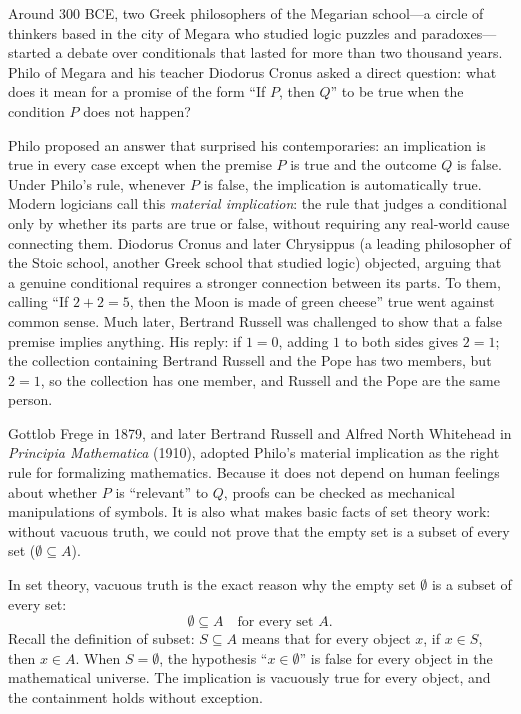 \begin{historybox}
Around 300 BCE, two Greek philosophers of the Megarian school---a circle of thinkers based in the city of Megara who studied logic puzzles and paradoxes---started a debate over conditionals that lasted for more than two thousand years. Philo of Megara and his teacher Diodorus Cronus asked a direct question: what does it mean for a promise of the form ``If $P$, then $Q$'' to be true when the condition $P$ does not happen?

Philo proposed an answer that surprised his contemporaries: an implication is true in every case except when the premise $P$ is true and the outcome $Q$ is false. Under Philo's rule, whenever $P$ is false, the implication is automatically true. Modern logicians call this \emph{material implication}: the rule that judges a conditional only by whether its parts are true or false, without requiring any real-world cause connecting them. Diodorus Cronus and later Chrysippus (a leading philosopher of the Stoic school, another Greek school that studied logic) objected, arguing that a genuine conditional requires a stronger connection between its parts. To them, calling ``If $2 + 2 = 5$, then the Moon is made of green cheese'' true went against common sense. Much later, Bertrand Russell was challenged to show that a false premise implies anything. His reply: if $1 = 0$, adding $1$ to both sides gives $2 = 1$; the collection containing Bertrand Russell and the Pope has two members, but $2 = 1$, so the collection has one member, and Russell and the Pope are the same person.

Gottlob Frege in 1879, and later Bertrand Russell and Alfred North Whitehead in \emph{Principia Mathematica} (1910), adopted Philo's material implication as the right rule for formalizing mathematics. Because it does not depend on human feelings about whether $P$ is ``relevant'' to $Q$, proofs can be checked as mechanical manipulations of symbols. It is also what makes basic facts of set theory work: without vacuous truth, we could not prove that the empty set is a subset of every set ($\emptyset \subseteq A$).
\end{historybox}

In set theory, vacuous truth is the exact reason why the empty set $\emptyset$ is a subset of every set:
\[
\emptyset \subseteq A \quad \text{for every set } A.
\]
Recall the definition of subset: $S \subseteq A$ means that for every object $x$, if $x \in S$, then $x \in A$. When $S = \emptyset$, the hypothesis ``$x \in \emptyset$'' is false for every object in the mathematical universe. The implication is vacuously true for every object, and the containment holds without exception.

